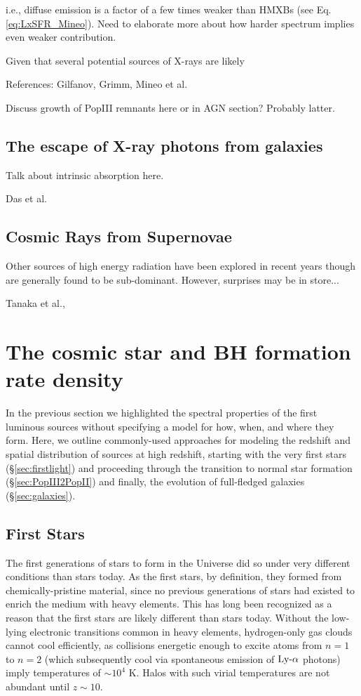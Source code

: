 i.e., diffuse emission is a factor of a few times weaker than HMXBs (see Eq. \ref{eq:LxSFR_Mineo}). Need to elaborate more about how harder spectrum implies even weaker contribution.


Given that several potential sources of X-rays are likely 


References: Gilfanov, Grimm, Mineo et al. 


Discuss growth of PopIII remnants here or in AGN section? Probably latter.

\subsection{The escape of X-ray photons from galaxies}
Talk about intrinsic absorption here.

Das et al.


\subsection{Cosmic Rays from Supernovae}
Other sources of high energy radiation have been explored in recent years though are generally found to be sub-dominant. However, surprises may be in store...


Tanaka et al., 


\section{The cosmic star and BH formation rate density} \label{sec:sfrd}
In the previous section we highlighted the spectral properties of the first luminous sources without specifying a model for how, when, and where they form. Here, we outline commonly-used approaches for modeling the redshift and spatial distribution of sources at high redshift, starting with the very first stars (\S\ref{sec:firstlight}) and proceeding through the transition to normal star formation (\S\ref{sec:PopIII2PopII}) and finally, the evolution of full-fledged galaxies (\S\ref{sec:galaxies}).




\subsection{First Stars} \label{sec:firststars}
The first generations of stars to form in the Universe did so under very different conditions than stars today. As the first stars, by definition, they formed from chemically-pristine material, since no previous generations of stars had existed to enrich the medium with heavy elements. This has long been recognized as a reason that the first stars are likely different than stars today. Without the low-lying electronic transitions common in heavy elements, hydrogen-only gas clouds cannot cool efficiently, as collisions energetic enough to excite atoms from $n=1$ to $n=2$ (which subsequently cool via spontaneous emission of $\text{Ly-}\alpha$ photons) imply temperatures of $\sim 10^4$ K. Halos with such virial temperatures are not abundant until $z \sim 10$.

